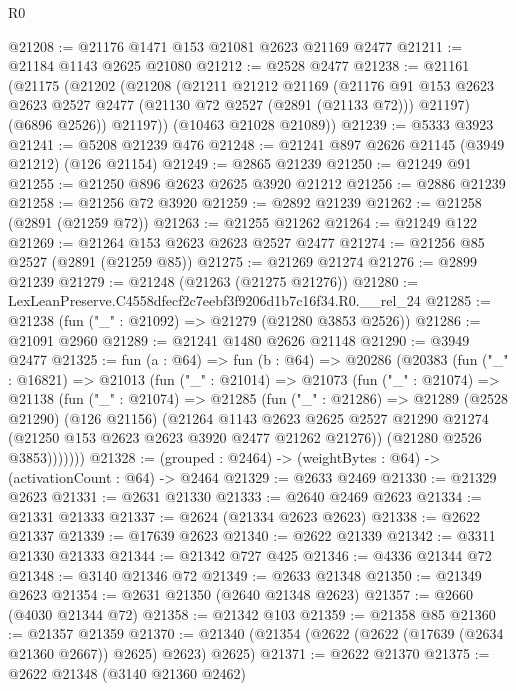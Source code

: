 \begin{lexlean}{R0}
\begin{coremodule}
@21208 := @21176 @1471 @153 @21081 @2623 @21169 @2477
@21211 := @21184 @1143 @2625 @21080
@21212 := @2528 @2477
@21238 := @21161
    (@21175
      (@21202
        (@21208
          (@21211
            @21212
            @21169
            (@21176 @91 @153 @2623 @2623 @2527 @2477 (@21130 @72 @2527 (@2891 (@21133 @72))) @21197)
            (@6896 @2526))
          @21197))
      (@10463 @21028 @21089))
@21239 := @5333 @3923
@21241 := @5208 @21239 @476
@21248 := @21241 @897 @2626 @21145 (@3949 @21212) (@126 @21154)
@21249 := @2865 @21239
@21250 := @21249 @91
@21255 := @21250 @896 @2623 @2625 @3920 @21212
@21256 := @2886 @21239
@21258 := @21256 @72 @3920
@21259 := @2892 @21239
@21262 := @21258 (@2891 (@21259 @72))
@21263 := @21255 @21262
@21264 := @21249 @122
@21269 := @21264 @153 @2623 @2623 @2527 @2477
@21274 := @21256 @85 @2527 (@2891 (@21259 @85))
@21275 := @21269 @21274
@21276 := @2899 @21239
@21279 := @21248 (@21263 (@21275 @21276))
@21280 := LexLeanPreserve.C4558dfecf2c7eebf3f9206d1b7c16f34.R0.__rel_24
@21285 := @21238 (fun ("_" : @21092) => @21279 (@21280 @3853 @2526))
@21286 := @21091 @2960
@21289 := @21241 @1480 @2626 @21148
@21290 := @3949 @2477
@21325 := fun (a : @64) =>
  fun (b : @64) =>
  @20286
    (@20383
      (fun ("_" : @16821) =>
      @21013
        (fun ("_" : @21014) =>
        @21073
          (fun ("_" : @21074) =>
          @21138
            (fun ("_" : @21074) =>
            @21285
              (fun ("_" : @21286) =>
              @21289
                (@2528 @21290)
                (@126 @21156)
                (@21264
                  @1143
                  @2623
                  @2625
                  @2527
                  @21290
                  @21274
                  (@21250 @153 @2623 @2623 @3920 @2477 @21262 @21276))
                (@21280 @2526 @3853)))))))
@21328 := (grouped : @2464) -> (weightBytes : @64) -> (activationCount : @64) -> @2464
@21329 := @2633 @2469
@21330 := @21329 @2623
@21331 := @2631 @21330
@21333 := @2640 @2469 @2623
@21334 := @21331 @21333
@21337 := @2624 (@21334 @2623 @2623)
@21338 := @2622 @21337
@21339 := @17639 @2623
@21340 := @2622 @21339
@21342 := @3311 @21330 @21333
@21344 := @21342 @727 @425
@21346 := @4336 @21344 @72
@21348 := @3140 @21346 @72
@21349 := @2633 @21348
@21350 := @21349 @2623
@21354 := @2631 @21350 (@2640 @21348 @2623)
@21357 := @2660 (@4030 @21344 @72)
@21358 := @21342 @103
@21359 := @21358 @85
@21360 := @21357 @21359
@21370 := @21340 (@21354 (@2622 (@2622 (@17639 (@2634 @21360 @2667)) @2625) @2623) @2625)
@21371 := @2622 @21370
@21375 := @2622 @21348 (@3140 @21360 @2462)

\end{coremodule}
\end{lexlean}
